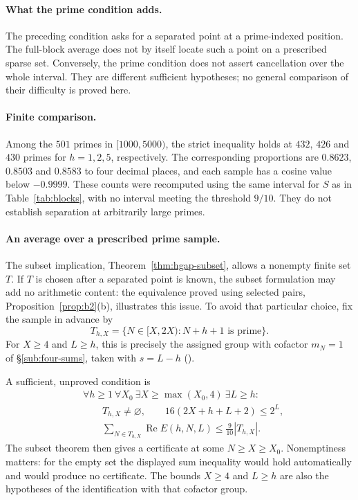\paragraph{What the prime condition adds.}
The preceding condition asks for a separated point at a prime-indexed
position. The full-block average does not by itself locate such a point
on a prescribed sparse set. Conversely, the prime condition does not
assert cancellation over the whole interval. They are different
sufficient hypotheses; no general comparison of their difficulty is
proved here.

\paragraph{Finite comparison.}
Among the $501$ primes in $[1000,5000)$, the strict inequality holds
at $432$, $426$ and $430$ primes for $h=1,2,5$, respectively. The
corresponding proportions are $0.8623$, $0.8503$ and $0.8583$ to four
decimal places, and each sample has a cosine value below $-0.9999$.
These counts were recomputed using the same interval for $S$ as in
Table~\ref{tab:blocks}, with no interval meeting the threshold $9/10$.
They do not establish separation at arbitrarily large primes.

\paragraph{An average over a prescribed prime sample.}
The subset implication, Theorem~\ref{thm:hgap-subset},
allows a nonempty finite set $T$. If $T$ is chosen after a separated
point is known, the subset formulation may add no arithmetic content:
the equivalence proved using selected pairs,
Proposition~\ref{prop:b2}(b), illustrates this issue.
To avoid that particular choice, fix the sample in advance by
\[
 T_{h,X}=\{N\in[X,2X):N+h+1\text{ is prime}\}.
\]
For $X\ge4$ and $L\ge h$, this is precisely the assigned group with
cofactor $m_N=1$ of \S\ref{sub:four-sums}, taken with $s=L-h$
().

A sufficient, unproved condition is
\begin{equation}\label{eq:primefibre}
\begin{aligned}
 &\forall h\ge1\ \forall X_0\ \exists X\ge\max(X_0,4)\ \exists L\ge h:\\
 &\qquad T_{h,X}\ne\varnothing,\qquad
          16(2X+h+L+2)\le2^L,\\
 &\qquad \sum_{N\in T_{h,X}}\operatorname{Re}E(h,N,L)
       \le\frac9{10}|T_{h,X}|.
\end{aligned}
\end{equation}
The subset theorem then gives a certificate at some $N\ge X\ge X_0$.
Nonemptiness matters: for the empty set the displayed sum inequality
would hold automatically and would produce no certificate. The bounds
$X\ge4$ and $L\ge h$ are also the hypotheses of the identification with
that cofactor group.


